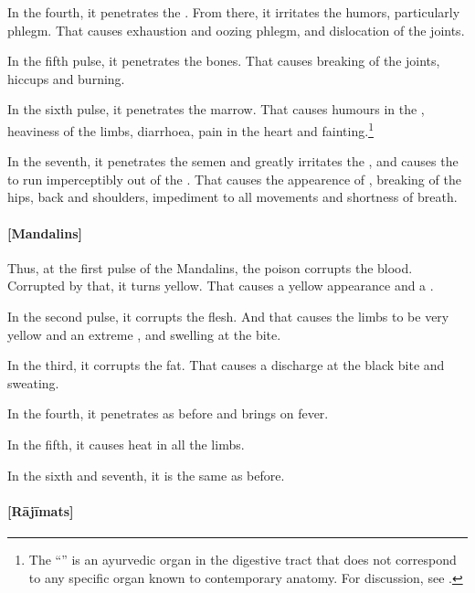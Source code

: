 \begin{translation}

In the fourth, it penetrates the .  From there, it 
irritates the humors, particularly phlegm. That causes exhaustion and oozing 
phlegm, and dislocation of the joints.

In the fifth pulse, it penetrates the bones.  That causes breaking of the joints, 
hiccups 
and burning.

In the sixth pulse, it penetrates the marrow.  That causes humours in the
, heaviness of the limbs, diarrhoea,
pain in the heart and fainting.\footnote{The “” is an ayurvedic organ in the digestive tract that does not
    correspond to any specific organ known to contemporary anatomy.  For
    discussion, see \cites[v.\,1,
    304]{josi-maha}[619]{meul-1974}[544--545]{das-2003}.}
    
In the seventh, it penetrates the semen and greatly irritates the
, and  causes the  to run
imperceptibly out of the .  That causes the appearence
of , breaking of the hips, back and shoulders, impediment 
to all movements and shortness of breath.
    
    
\paragraph{[Mandalins]}    
Thus, at the first pulse of the Mandalins, the poison corrupts the blood.  
Corrupted by that, it turns yellow. That causes a yellow appearance and a 
.

In the second pulse, it corrupts the flesh.  And that causes the
limbs to be very yellow and an extreme , and swelling at the bite.

In the third, it corrupts the fat.  That causes a discharge at the black bite and 
sweating.

In the fourth, it penetrates as before and brings on fever.

In the fifth, it causes heat in all the limbs. 

In the sixth and seventh, it is the same as before. 

\paragraph{[Rājīmats]}


\end{translation}

